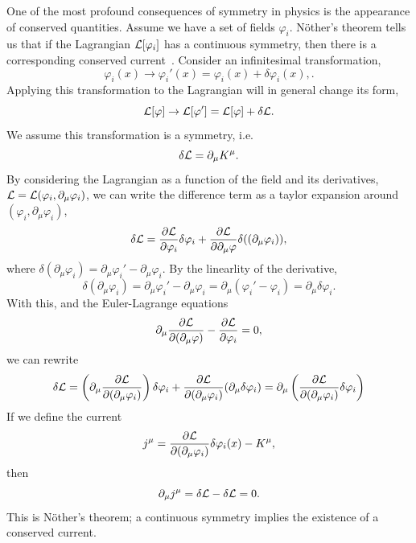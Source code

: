 One of the most profound consequences of symmetry in physics is the appearance of conserved quantities.
Assume we have a set of fields $\varphi_i$. Nöther's theorem tells us that if the Lagrangian $\mathcal{L}[\varphi_i]$ has a continuous symmetry, then there is a corresponding conserved current~\cite{Peskin:IntroQFT,Carroll:space-time}.
Consider an infinitesimal transformation,
\begin{equation}
    \varphi_i(x) \longrightarrow \varphi_i'(x)
    = \varphi_i(x) + \delta \varphi_i(x),.
\end{equation}
Applying this transformation to the Lagrangian will in general change its form,
\begin{equation}
    \mathcal{L}[\varphi] \rightarrow \mathcal{L}[\varphi']
    = \mathcal{L}[\varphi] + \delta \mathcal{L}.
\end{equation}
We assume this transformation is a symmetry, i.e.
\begin{equation*}
    \delta \mathcal{L} = \partial_\mu K^\mu.
\end{equation*}
By considering the Lagrangian as a function of the field and its derivatives, $\mathcal{L} = \mathcal{L}(\varphi_i, \partial_\mu \varphi_i)$, we can write the difference term as a taylor expansion around $(\varphi_i, \partial_\mu \varphi_i)$,
\begin{align}
    \delta \Ell
    = \diffp{\Ell}{\varphi_i} \delta \varphi_i
    + \diffp{\Ell}{\partial_\mu \varphi} \delta ((\partial_\mu \varphi_i)),
\end{align}
where $\delta (\partial_\mu \varphi_i) = \partial_\mu \varphi_i' - \partial_\mu \varphi_i$.
By the linearlity of the derivative,
\begin{equation}
    \delta (\partial_\mu \varphi_i)
    = \partial_\mu \varphi_i' - \partial_\mu \varphi_i
    = \partial_\mu (\varphi_i' - \varphi_i)
    = \partial_\mu \delta \varphi_i.
\end{equation}
With this, and the Euler-Lagrange equations
\begin{equation}
    \partial_\mu \diffp{\Ell}{(\partial_\mu \varphi)} - \diffp{\Ell}{\varphi_i} = 0,
\end{equation}
we can rewrite
\begin{equation}
    \delta \Ell = \left( \partial_\mu \diffp{\Ell}{(\partial_\mu \varphi_i)} \right) \delta \varphi_i
    + \diffp{\Ell}{(\partial_\mu \varphi_i)} (\partial_\mu \delta \varphi_i)
    = \partial_\mu \left(\diffp{\Ell}{(\partial_\mu \varphi_i)} \delta \varphi_i\right)
\end{equation}
If we define the current
\begin{equation}
    j^\mu = \pdv{\mathcal{L}}{(\partial_\mu \varphi_i)} \delta \varphi_i(x) - K^\mu,
\end{equation}
then 
\begin{equation}
    \partial_\mu j^\mu = \delta \mathcal{L} - \delta \mathcal{L} = 0.
\end{equation}
This is Nöther's theorem; a continuous symmetry implies the existence of a conserved current.

